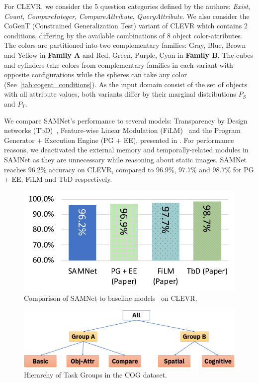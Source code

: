 For CLEVR, we consider the 5 question categories defined by the authors: \textit{Exist}, \textit{Count}, \textit{CompareInteger}, \textit{CompareAttribute}, \textit{QueryAttribute}. We also consider the CoGenT (Constrained Generalization Test) variant of CLEVR which contains 2 conditions, differing by the available combinations of 8 object color-attributes. The colors are partitioned into two complementary families:
Gray, Blue, Brown and Yellow in \textbf{Family A} and Red, Green, Purple, Cyan in \textbf{Family B}.
The cubes and cylinders take colors from complementary families in each variant with opposite configurations while the spheres can take any color (See~\cref{tab:cogent_conditions}).
As the input domain consist of the set of objects with all attribute values, both variants differ by their marginal distributions $P_S$ and $P_T$.

We compare SAMNet's performance to several models: Transparency by Design networks (TbD)~\cite{mascharka2018transparency}, Feature-wise Linear Modulation (FiLM)~\cite{perez2018film} and the Program Generator + Execution Engine (PG + EE), presented in \cite{johnson2017inferring}. For performance reasons, we deactivated the external memory and temporally-related modules in SAMNet as they are unnecessary while reasoning about static images. SAMNet reaches 96.2\% accuracy on CLEVR, compared to 96.9\%, 97.7\% and 98.7\% for PG + EE, FiLM and TbD respectively.

\begin{figure}[!t]
	\centering
	\includegraphics[width=0.8\columnwidth]{../img/plots/clevr_baselines.pdf}
	\caption{Comparison of SAMNet to baseline models~\cite{mascharka2018transparency, perez2018film, johnson2017inferring} on CLEVR.}
	\label{fig:clevr-baseline-compare}
\end{figure}

\begin{figure}[htb]
	\centering
	\includegraphics[width=\columnwidth]{../img/architecture/hierarchy}
	\caption{Hierarchy of Task Groups in the COG dataset.}
	\label{fig:task-groups}
\end{figure}

